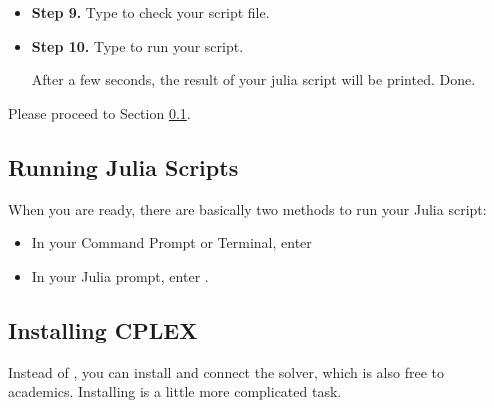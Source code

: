 \begin{itemize}
\item \textbf{Step 9.} Type  to check your script file.


\item \textbf{Step 10.} Type  to run your script.



After a few seconds, the result of your julia script will be printed. Done.

\end{itemize}

Please proceed to Section \ref{sec:running_julia}.

















\subsection{Running Julia Scripts} \label{sec:running_julia}
When you are ready, there are basically two methods to run your Julia script:
\begin{itemize}
\item In your Command Prompt or Terminal, enter 
\item In your Julia prompt, enter .
\end{itemize}


\subsection{Installing CPLEX}

Instead of \gurobi{}, you can install and connect the \cplex{} solver, which is also free to academics. Installing \cplex{} is a little more complicated task.

